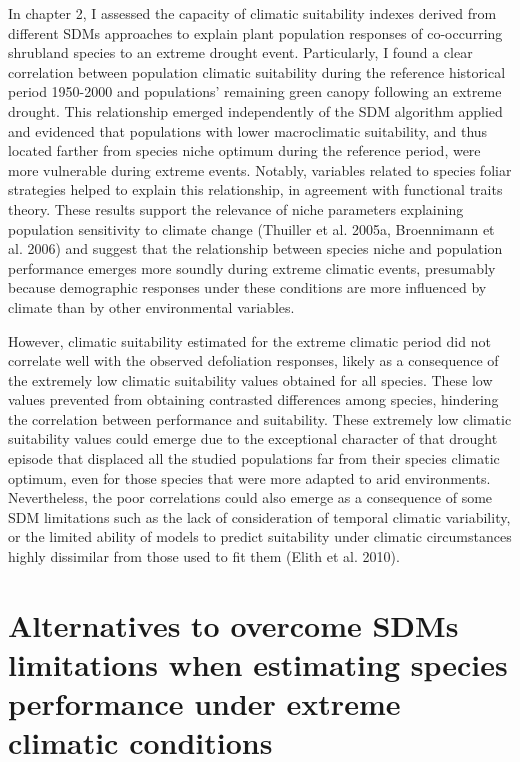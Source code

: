 \documentclass[11pt,twoside]{reedthesis}
\begin{document}
In chapter 2, I assessed the capacity of climatic suitability indexes
derived from different SDMs approaches to explain plant population
responses of co-occurring shrubland species to an extreme drought event.
Particularly, I found a clear correlation between population climatic
suitability during the reference historical period 1950-2000 and
populations' remaining green canopy following an extreme drought. This
relationship emerged independently of the SDM algorithm applied and
evidenced that populations with lower macroclimatic suitability, and
thus located farther from species niche optimum during the reference
period, were more vulnerable during extreme events. Notably, variables
related to species foliar strategies helped to explain this
relationship, in agreement with functional traits theory. These results
support the relevance of niche parameters explaining population
sensitivity to climate change (Thuiller et al. 2005a, Broennimann et al.
2006) and suggest that the relationship between species niche and
population performance emerges more soundly during extreme climatic
events, presumably because demographic responses under these conditions
are more influenced by climate than by other environmental variables.
\par

However, climatic suitability estimated for the extreme climatic period
did not correlate well with the observed defoliation responses, likely
as a consequence of the extremely low climatic suitability values
obtained for all species. These low values prevented from obtaining
contrasted differences among species, hindering the correlation between
performance and suitability. These extremely low climatic suitability
values could emerge due to the exceptional character of that drought
episode that displaced all the studied populations far from their
species climatic optimum, even for those species that were more adapted
to arid environments. Nevertheless, the poor correlations could also
emerge as a consequence of some SDM limitations such as the lack of
consideration of temporal climatic variability, or the limited ability
of models to predict suitability under climatic circumstances highly
dissimilar from those used to fit them (Elith et al. 2010).\par
\newpage

\section{Alternatives to overcome SDMs limitations when estimating
species performance under extreme climatic
conditions}\label{alternatives-to-overcome-sdms-limitations-when-estimating-species-performance-under-extreme-climatic-conditions}
\end{document}
